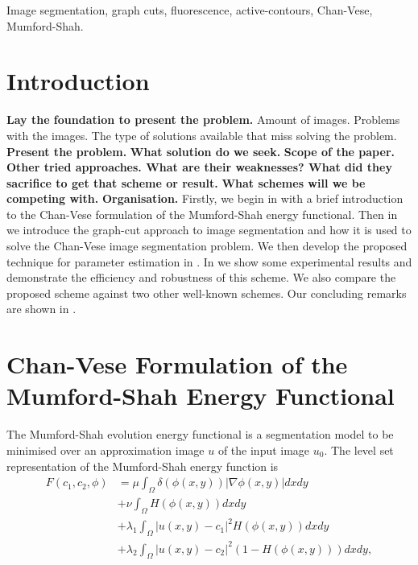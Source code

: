 \documentclass[10pt, journal, letterpaper, onecolumn, draftcls]{IEEEtran}
\begin{document}
\begin{IEEEkeywords}
Image segmentation, graph cuts, fluorescence, active-contours, Chan-Vese, Mumford-Shah.
\end{IEEEkeywords}






%



\section{Introduction}
\label{sec:Intro}
\textbf{Lay the foundation to present the problem.} Amount of images. Problems with the images. The type of solutions available that miss solving the problem.
\textbf{Present the problem.}
\textbf{What solution do we seek.}
\textbf{Scope of the paper.}
\textbf{Other tried approaches. What are their weaknesses? What did they sacrifice to get that scheme or result.}
\textbf{What schemes will we be competing with.}
\textbf{Organisation.} Firstly, we begin in  with a brief introduction to the Chan-Vese formulation of the  Mumford-Shah energy functional. Then in  we introduce the graph-cut approach to image segmentation and how it is used to solve the Chan-Vese image segmentation problem. We then develop the proposed technique for parameter estimation in . In  we show some experimental results and demonstrate the efficiency and robustness of this scheme. We also compare the proposed scheme against two other well-known schemes. Our concluding remarks are shown in .

\section{Chan-Vese Formulation of the Mumford-Shah Energy Functional}
\label{sec:CVformulation}
The Mumford-Shah evolution energy functional is a segmentation model to be minimised over an approximation image $u$ of the input image $u_0$. The level set representation of the Mumford-Shah energy function is 
\begin{equation}
\begin{split}
	F(c_1, c_2, \phi) & = \mu \int_\Omega \delta(\phi(x,y))|\nabla\phi(x,y)|dxdy \\
	& + \nu \int_\Omega H(\phi(x,y))dxdy \\
	& + \lambda_1 \int_\Omega |u(x,y)-c_1|^2H(\phi(x,y))dxdy \\
	& + \lambda_2 \int_\Omega |u(x,y)-c_2|^2(1-H(\phi(x,y)))dxdy,
	\end{split}
	\label{eq:mumfordshahfunction}
\end{equation}
\end{document}
